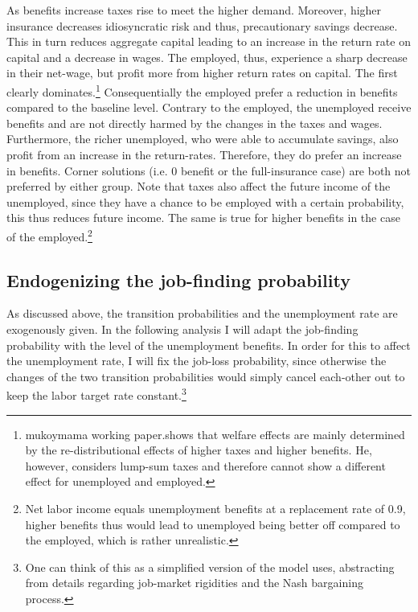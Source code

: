 \documentclass[a4paper,12pt]{article}
\begin{document}
As benefits increase taxes rise to meet the higher demand. Moreover, higher insurance decreases idiosyncratic risk and thus, precautionary savings decrease. This in turn reduces aggregate capital leading to an increase in the return rate on capital and a decrease in wages. 
The employed, thus, experience a sharp decrease in their net-wage, but profit more from higher return rates on capital. The first clearly dominates.\footnote{ mukoymama working paper.shows that welfare effects are mainly determined by the re-distributional effects of higher taxes and higher benefits. He, however, considers lump-sum taxes and therefore cannot show a different effect for unemployed and employed.} Consequentially the employed prefer a reduction in benefits compared to the baseline level. 
Contrary to the employed, the unemployed receive benefits and are not directly harmed by the changes in the taxes and wages. Furthermore, the richer unemployed, who were able to accumulate savings, also profit from an increase in the return-rates. 
Therefore, they do prefer an increase in benefits. 
Corner solutions (i.e. 0 benefit or the full-insurance case) are both not preferred by either group. Note that taxes also affect the future income of the unemployed, since they have a chance to be employed with a certain probability, this thus reduces future income. The same is true for higher benefits in the case of the employed.\footnote{Net labor income equals unemployment benefits at a replacement rate of 0.9, higher benefits thus would lead to unemployed being better off compared to the employed, which is rather unrealistic.}


\subsection{Endogenizing the job-finding probability}

As discussed above, the transition probabilities and the unemployment rate are exogenously given. In the following analysis I will adapt the job-finding probability with the level of the unemployment benefits. In order for this to affect the unemployment rate, I will fix the job-loss probability, since otherwise the changes of the two transition probabilities would simply cancel each-other out to keep the labor target rate constant.\footnote{One can think of this as a simplified version of the model \cite{mukoyama} uses, abstracting from details regarding job-market rigidities and the Nash bargaining process.} 
\end{document}
